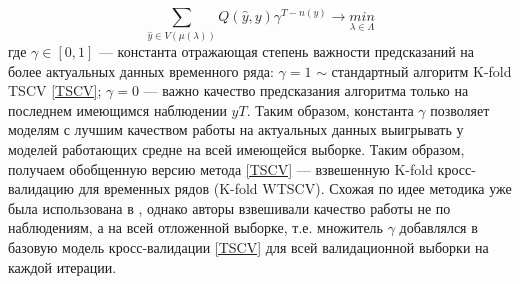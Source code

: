 \documentclass[a4paper, 14pt]{article}
\begin{document}
\begin{equation}\label{WTSCV}
\sum_{\hat y \in V(\mu(\lambda))} Q(\hat y, y) \gamma^{T - n(y)} \rightarrow \underset{\lambda \in \Lambda}{min}
\end{equation}
где $\gamma \in \left[0, 1\right]$ --- константа отражающая степень важности предсказаний на более актуальных данных временного ряда: $\gamma = 1$ $\sim$ стандартный алгоритм K-fold TSCV \eqref{TSCV}; $\gamma = 0$ --- важно качество предсказания алгоритма только на последнем имеющимся наблюдении $yT$. Таким образом, константа $\gamma$ позволяет моделям с лучшим качеством работы на актуальных данных выигрывать у моделей работающих средне на всей имеющейся выборке. Таким образом, получаем обобщенную версию метода \eqref{TSCV} --- взвешенную K-fold кросс-валидацию для временных рядов (K-fold WTSCV). Схожая по идее методика уже была использована в \cite{donate2013time}, однако авторы взвешивали качество работы не по наблюдениям, а на всей отложенной выборке, т.е. множитель $\gamma$ добавлялся в базовую модель кросс-валидации \eqref{TSCV} для всей валидационной выборки на каждой итерации.
\newpage
\end{document}
